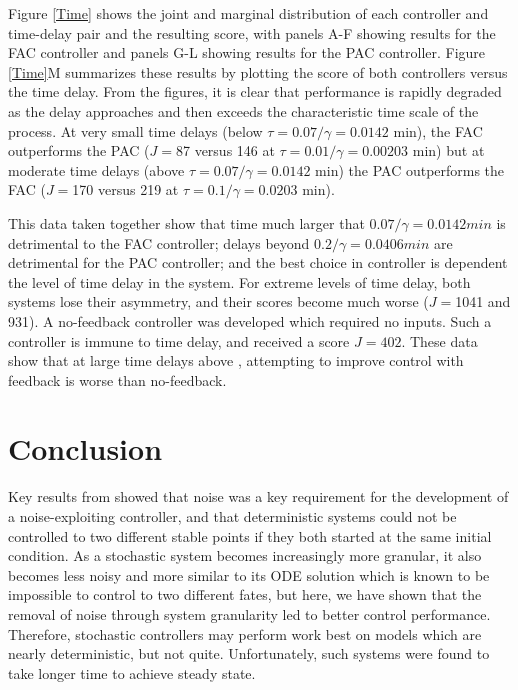 \documentclass[12pt]{article}
\begin{document}
Figure \ref{Time} shows the joint and marginal distribution of each controller and time-delay pair and the resulting score, with panels A-F showing results for the FAC controller and panels G-L showing results for the PAC controller. Figure \ref{Time}M summarizes these results by plotting the score of both controllers versus the time delay. From the figures, it is clear that performance is rapidly degraded as the delay approaches and then exceeds the characteristic time scale of the process. At very small time delays (below $\tau = 0.07/\gamma = 0.0142$ min), the FAC outperforms the PAC ($J=$87 versus 146 at $\tau = 0.01/\gamma = 0.00203$ min) but at moderate time delays (above $\tau = 0.07/\gamma = 0.0142$ min) the PAC outperforms the FAC ($J=$170 versus 219 at $\tau = 0.1/\gamma = 0.0203$ min). 

This data taken together show that time much larger that $0.07 / \gamma = 0.0142 min$ is detrimental to the FAC controller; delays beyond $0.2 / \gamma = 0.0406 min$ are detrimental for the PAC controller; and the best choice in controller is dependent the level of time delay in the system.  For extreme levels of time delay, both systems lose their asymmetry, and their scores become much worse ($J=$1041 and 931). A no-feedback controller was developed which required no inputs. Such a controller is immune to time delay, and received a score $J=402$. These data show that at large time delays above , attempting to improve control with feedback is worse than no-feedback.

\section{Conclusion}
Key results from \cite{May2021} showed that noise was a key requirement for the development of a noise-exploiting controller, and that deterministic systems could not be controlled to two different stable points if they both started at the same initial condition. As a stochastic system becomes increasingly more granular, it also becomes less noisy and more similar to its ODE solution which is known to be impossible to control to two different fates, but here, we have shown that the removal of noise through system granularity led to better control performance.  Therefore, stochastic controllers may perform work best on models which are nearly deterministic, but not quite. Unfortunately, such systems were found to take longer time to achieve steady state.
\end{document}
